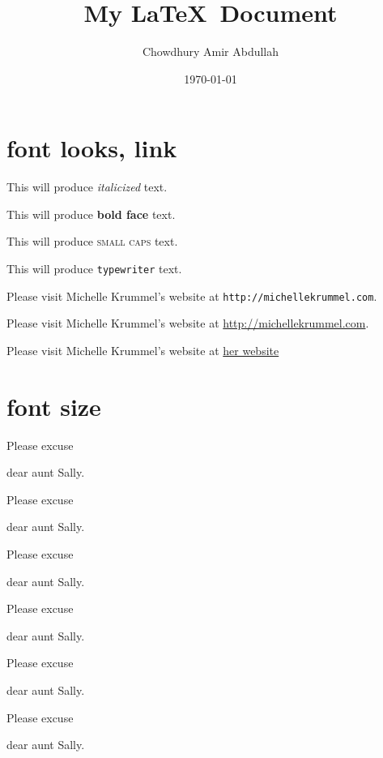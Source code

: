 \documentclass[11pt]{article}
\title{My \LaTeX\ Document}
\author{Chowdhury Amir Abdullah}
\date{\today}
\begin{document}
\maketitle

\tableofcontents

\pagebreak

\section{font looks, link}

This will produce \textit{italicized} text. 

This will produce \textbf{bold face} text. 

This will produce \textsc{small caps} text. 

This will produce \texttt{typewriter} text. 

Please visit Michelle Krummel's website at \texttt{http://michellekrummel.com}.

Please visit Michelle Krummel's website at \url{http://michellekrummel.com}.

Please visit Michelle Krummel's website at \href{http://michellekrummel.com}{her website}





\section{font size}

Please excuse \begin{Huge}dear aunt Sally. \end{Huge}

Please excuse \begin{huge} dear aunt Sally. \end{huge}

Please excuse \begin{LARGE} dear aunt Sally. \end{LARGE}

Please excuse \begin{Large} dear aunt Sally. \end{Large}

Please excuse \begin{large} dear aunt Sally. \end{large}

Please excuse \begin{normalsize} dear aunt Sally. \end{normalsize}
\end{document}

